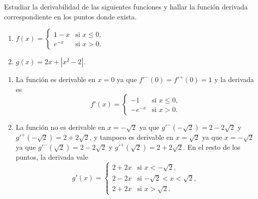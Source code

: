 {Estudiar la derivabilidad de las siguientes funciones y hallar la función derivada correspondiente en los puntos donde exista.
\begin{enumerate}
\item  $f(x)=
\begin{cases}
1-x & \mbox{si $x\leq 0$,} \\
e^{-x} & \mbox{si $x>0$.}
\end{cases}
$
\item  $g(x)=2x+|x^2-2|$.
\end{enumerate}
}
{\begin{enumerate}
\item La función es derivable en $x=0$ ya que $f'^-(0)=f'^+(0) = 1$ y la derivada es
\[f'(x)=
\begin{cases}
-1 & \mbox{si $x\leq 0$,} \\
-e^{-x} & \mbox{si $x>0$.}
\end{cases}
\]
\item La función no es derivable en $x=-\sqrt{2}$ ya que $g'^-(-\sqrt{2})=2-2\sqrt 2$ y $g'^+(-\sqrt{2})=2+2\sqrt 2$, y tampoco es derivable en $x=\sqrt 2$ ya que $x=-\sqrt{2}$ ya que $g'^-(\sqrt{2})=2-2\sqrt 2$ y $g'^+(\sqrt{2})=2+2\sqrt 2$. En el resto de los puntos, la derivada vale
\[
g'(x)=
\begin{cases}
2+2x & \mbox{si $x< -\sqrt{2}$,} \\
2-2x & \mbox{si $-\sqrt 2 < x < \sqrt 2$,}\\
2+2x & \mbox{si $x > \sqrt 2$.}
\end{cases}
\]
\end{enumerate}
}
